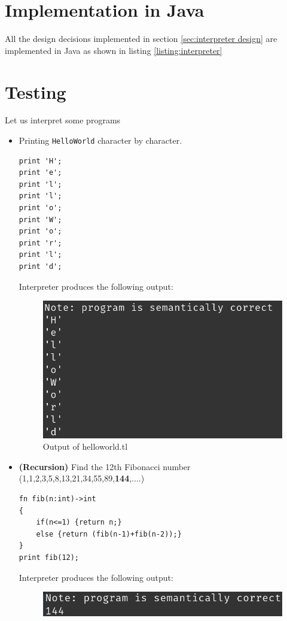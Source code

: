 \section{Implementation in Java}
All the design decisions implemented in section \ref{sec:interpreter design} are implemented in Java as shown in listing \ref{listing:interpreter}

\section{Testing}
Let us interpret some programs
\begin{itemize}
    \item Printing \verb!HelloWorld! character by character.
\begin{lstlisting}[basicstyle=\tiny,caption=helloworld.tl]
print 'H';
print 'e';
print 'l';
print 'l';
print 'o';
print 'W';
print 'o';
print 'r';
print 'l';
print 'd';
\end{lstlisting}
Interpreter produces the following output:
\begin{figure}[H]
    \centering
    \includegraphics[scale=0.8]{Task345/images/helloworld.png}
    \caption{Output of helloworld.tl}
    \label{fig:output helloworld}
\end{figure}
\item \textbf{(Recursion)} Find the 12th Fibonacci number (1,1,2,3,5,8,13,21,34,55,89,\textbf{144},....)  
\begin{lstlisting}[basicstyle=\tiny,caption=fibonacci.tl]
fn fib(n:int)->int
{
	if(n<=1) {return n;}
	else {return (fib(n-1)+fib(n-2));}
}
print fib(12);
\end{lstlisting}
Interpreter produces the following output:
\begin{figure}[H]
    \centering
    \includegraphics[scale=0.8]{Task345/images/fib.png}

\end{figure}
\end{itemize}
